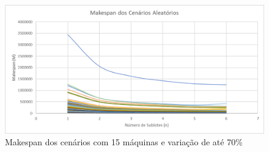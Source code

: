 \begin{figure}[!ht]
    \centering
    \includegraphics[width=12cm]{Resultados/Figuras/M15_70}
    \caption{Makespan dos cenários com 15 máquinas e variação de até 70\%}
    \label{fig:M15_70}
\end{figure}